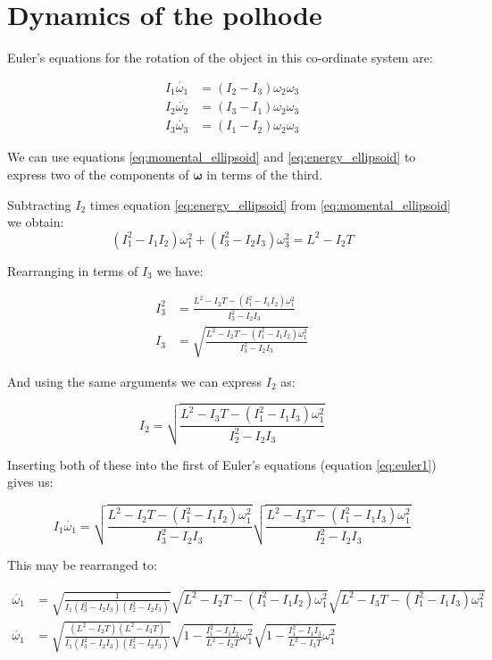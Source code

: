 \documentclass[a4paper, 12pt]{article}
\begin{document}
\section{Dynamics of the polhode}

Euler's equations for the rotation of the object in this co-ordinate system are:

\begin{align}
  I_1\dot{\omega_1}& =(I_2 - I_3)\omega_2\omega_3 \label{eq:euler1} \\
  I_2\dot{\omega_2}& =(I_3 - I_1)\omega_2\omega_3 \\
  I_3\dot{\omega_3}& =(I_1 - I_2)\omega_2\omega_3 
\end{align}

We can use equations \ref{eq:momental_ellipsoid} and \ref{eq:energy_ellipsoid} to express two of the components of $\boldsymbol{\omega}$ in terms of the third.

Subtracting $I_2$ times equation \ref{eq:energy_ellipsoid} from \ref{eq:momental_ellipsoid} we obtain:
\begin{equation}
  (I_1^2 - I_1I_2)\omega_1^2 + (I_3^2 - I_2I_3)\omega_3^2 = L^2 - I_2T
\end{equation}

Rearranging in terms of $I_3$ we have:

\begin{align}
  I_3^2 &=\frac{L^2 - I_2T - (I_1^2 - I_1I_2)\omega_1^2}{I_3^2 - I_2I_3} \\
  I_3 &=\sqrt{\frac{L^2 - I_2T - (I_1^2 - I_1I_2)\omega_1^2}{I_3^2 - I_2I_3}}
\end{align}

And using the same arguments we can express $I_2$ as:

\begin{equation}
  I_2 =\sqrt{\frac{L^2 - I_3T - (I_1^2 - I_1I_3)\omega_1^2}{I_2^2 - I_2I_3}}
\end{equation}


Inserting both of these into the first of Euler's equations (equation \ref{eq:euler1}) gives us:

\begin{equation}
  I_1\dot{\omega_1} = \sqrt{\frac{L^2 - I_2T - (I_1^2 - I_1I_2)\omega_1^2}{I_3^2 - I_2I_3}}\sqrt{\frac{L^2 - I_3T - (I_1^2 - I_1I_3)\omega_1^2}{I_2^2 - I_2I_3}}
\end{equation}

This may be rearranged to:

  \begin{align}
    \dot{\omega_1} &= \sqrt{\frac{1}{I_1(I_3^2 - I_2I_3)(I_2^2 - I_2I_3)}}\sqrt{L^2 - I_2T - (I_1^2 - I_1I_2)\omega_1^2}\sqrt{L^2 - I_3T - (I_1^2 - I_1I_3)\omega_1^2} \\
    \dot{\omega_1} &= \sqrt{\frac{(L^2 - I_2T)(L^2 - I_3T)}{I_1(I_3^2 - I_2I_3)(I_2^2 - I_2I_3)}}\sqrt{ 1 - \frac{I_1^2 - I_1I_2}{L^2 - I_2T}\omega_1^2}\sqrt{ 1 - \frac{I_1^2 - I_1I_3}{L^2 - I_3T}\omega_1^2}\label{eq:fullode}
  \end{align}
\end{document}
